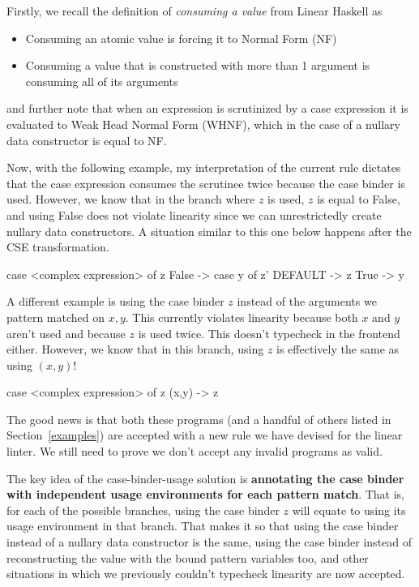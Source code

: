 \documentclass[a4paper, draft]{report}
\begin{document}
Firstly, we recall the definition of \emph{consuming a value} from Linear
Haskell as
\begin{itemize}
    \item Consuming an atomic value is forcing it to Normal Form (NF)
    \item Consuming a value that is constructed with more than 1 argument is
        consuming all of its arguments
\end{itemize}
and further note that when an expression is scrutinized by a case expression it
is evaluated to Weak Head Normal Form (WHNF), which in the case of a nullary data
constructor is equal to NF.

Now, with the following example, my interpretation of the current rule dictates
that the case expression consumes the scrutinee twice because the case binder is
used. However, we know that in the branch where $z$ is used, $z$ is equal to
False, and using False does not violate linearity since we can unrestrictedly
create nullary data constructors. A situation similar to this one below happens
after the CSE transformation.
\begin{code}
    case <complex expression> of z {
        False -> case y of z' { DEFAULT -> z }
        True  -> y
    }
\end{code}

A different example is using the case binder $z$ instead of the arguments we
pattern matched on $x,y$. This currently violates linearity because both $x$ and
$y$ aren't used and because $z$ is used twice. This doesn't typecheck in the
frontend either. However, we know that in this branch, using $z$ is effectively
the same as using $(x,y)$!
\begin{code}
    case <complex expression> of z {
        (x,y) -> z
    }
\end{code}

The good news is that both these programs (and a handful of others listed in
Section~\ref{examples}) are accepted with a new rule we have devised for the
linear linter. We still need to prove we don't accept any invalid programs as
valid.

The key idea of the case-binder-usage solution is \textbf{annotating the case binder
with independent usage environments for each pattern match}. That is, for
each of the possible branches, using the case binder $z$ will equate to
using its usage environment in that branch. That makes it so that using the
case binder instead of a nullary data constructor is the same, using the case
binder instead of reconstructing the value with the bound pattern variables too,
and other situations in which we previously couldn't typecheck linearity are
now accepted.
\end{document}
